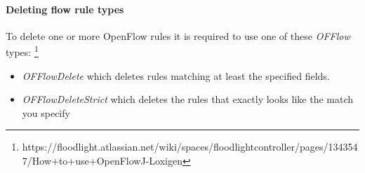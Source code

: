 \paragraph{Deleting flow rule types}
To delete one or more OpenFlow rules it is required to use one of these \textit{OFFlow} types: \footnote{https://floodlight.atlassian.net/wiki/spaces/floodlightcontroller/pages/1343547/How+to+use+OpenFlowJ-Loxigen}
\begin{itemize}
	\item \textit{OFFlowDelete} which deletes rules matching at least the specified fields.
	\item \textit{OFFlowDeleteStrict} which deletes the rules that exactly looks like the match you specify
\end{itemize}
